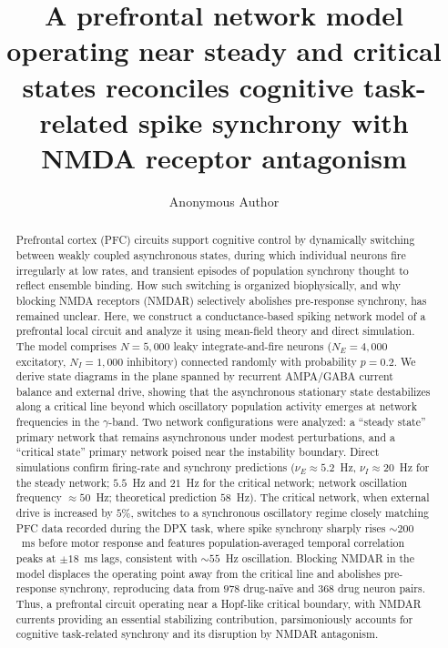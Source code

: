 \documentclass[11pt]{article}
\title{A prefrontal network model operating near steady and critical states reconciles cognitive task-related spike synchrony with NMDA receptor antagonism}
\author[1]{Anonymous Author}
\affil[1]{Department of Neuroscience, Anonymous University}
\date{}
\begin{document}
\maketitle

\begin{abstract}
Prefrontal cortex (PFC) circuits support cognitive control by dynamically switching between weakly coupled asynchronous states, during which individual neurons fire irregularly at low rates, and transient episodes of population synchrony thought to reflect ensemble binding. How such switching is organized biophysically, and why blocking NMDA receptors (NMDAR) selectively abolishes pre-response synchrony, has remained unclear. Here, we construct a conductance-based spiking network model of a prefrontal local circuit and analyze it using mean-field theory and direct simulation. The model comprises $N = 5{,}000$ leaky integrate-and-fire neurons ($N_E = 4{,}000$ excitatory, $N_I = 1{,}000$ inhibitory) connected randomly with probability $p = 0.2$. We derive state diagrams in the plane spanned by recurrent AMPA/GABA current balance and external drive, showing that the asynchronous stationary state destabilizes along a critical line beyond which oscillatory population activity emerges at network frequencies in the $\gamma$-band. Two network configurations were analyzed: a ``steady state'' primary network that remains asynchronous under modest perturbations, and a ``critical state'' primary network poised near the instability boundary. Direct simulations confirm firing-rate and synchrony predictions ($\nu_E \approx 5.2$~Hz, $\nu_I \approx 20$~Hz for the steady network; $5.5$~Hz and $21$~Hz for the critical network; network oscillation frequency $\approx 50$~Hz; theoretical prediction $58$~Hz). The critical network, when external drive is increased by $5\%$, switches to a synchronous oscillatory regime closely matching PFC data recorded during the DPX task, where spike synchrony sharply rises $\sim 200$~ms before motor response and features population-averaged temporal correlation peaks at $\pm 18$~ms lags, consistent with $\sim 55$~Hz oscillation. Blocking NMDAR in the model displaces the operating point away from the critical line and abolishes pre-response synchrony, reproducing data from $978$ drug-na\"ive and $368$ drug neuron pairs. Thus, a prefrontal circuit operating near a Hopf-like critical boundary, with NMDAR currents providing an essential stabilizing contribution, parsimoniously accounts for cognitive task-related synchrony and its disruption by NMDAR antagonism.
\end{abstract}
\end{document}
